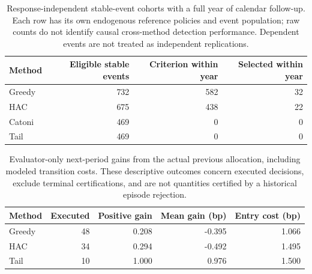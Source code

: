 \begin{table}[H]\centering\small

\begin{tabular}{lrrr}

\toprule

Method & Eligible stable events & Criterion within year & Selected within year \\

\midrule

Greedy & 732 & 582 & 32 \\

HAC & 675 & 438 & 22 \\

Catoni & 469 & 0 & 0 \\

Tail & 469 & 0 & 0 \\

\bottomrule\end{tabular}

\caption{Response-independent stable-event cohorts with a full year of calendar follow-up. Each row has its own endogenous reference policies and event population; raw counts do not identify causal cross-method detection performance. Dependent events are not treated as independent replications.}\end{table}

\begin{table}[H]\centering\small

\begin{tabular}{lrrrr}

\toprule

Method & Executed & Positive gain & Mean gain (bp) & Entry cost (bp) \\

\midrule

Greedy & 48 & 0.208 & -0.395 & 1.066 \\

HAC & 34 & 0.294 & -0.492 & 1.495 \\

Tail & 10 & 1.000 & 0.976 & 1.500 \\

\bottomrule\end{tabular}

\caption{Evaluator-only next-period gains from the actual previous allocation, including modeled transition costs. These descriptive outcomes concern executed decisions, exclude terminal certifications, and are not quantities certified by a historical episode rejection.}\end{table}

